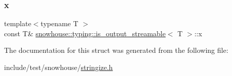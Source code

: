 \mbox{\label{structsnowhouse_1_1typing_1_1is__output__streamable_a680344f2a7ab0b3437f79957032ba326}} 
\subsubsection{\texorpdfstring{x}{x}}
{\footnotesize\ttfamily template$<$typename T $>$ \\
const T\& \mbox{\hyperlink{structsnowhouse_1_1typing_1_1is__output__streamable}{snowhouse\+::typing\+::is\+\_\+output\+\_\+streamable}}$<$ T $>$\+::x\hspace{0.3cm}{\ttfamily [static]}}



The documentation for this struct was generated from the following file\+:\begin{DoxyCompactItemize}
\item 
include/test/snowhouse/\mbox{\hyperlink{stringize_8h}{stringize.\+h}}\end{DoxyCompactItemize}

